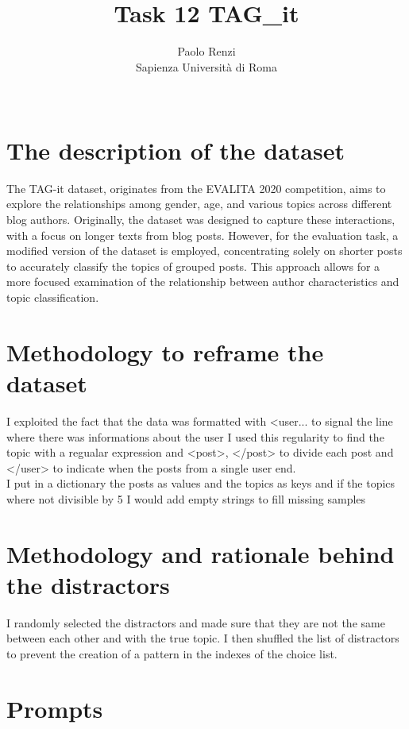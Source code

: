 \documentclass[11pt]{article}
\title{Task 12 TAG\_it}
\author{Paolo Renzi \\
  Sapienza Università di Roma\\\
  }
\begin{document}
\maketitle

\section{The description of the dataset}

The TAG-it dataset, originates from the EVALITA 2020 competition, aims to explore the relationships among gender, 
age, and various topics across different blog authors. Originally, the dataset was designed to capture these interactions, 
with a focus on longer texts from blog posts. However, for the evaluation task, a modified version of the dataset 
is employed, concentrating solely on shorter posts to accurately classify the topics of grouped posts. 
This approach allows for a more focused examination of the relationship between author characteristics and topic 
classification.

\section{Methodology to reframe the dataset}

I exploited the fact that the data was formatted with <user... to signal the line where there was informations 
about the user I used this regularity to find the topic with a regualar expression and <post>, </post> to divide 
each post and </user> to indicate when the posts from a single user end. \\
I put in a dictionary the posts as values and the topics as keys and if the topics where not divisible by 5 I would 
add empty strings to fill missing samples 

\section{Methodology and rationale behind the distractors}

I randomly selected the distractors and made sure that they are not the same between each other and with the true topic. 
I then shuffled the list of distractors to prevent the creation of a pattern in the indexes of the choice list.

\section{Prompts}
\end{document}
